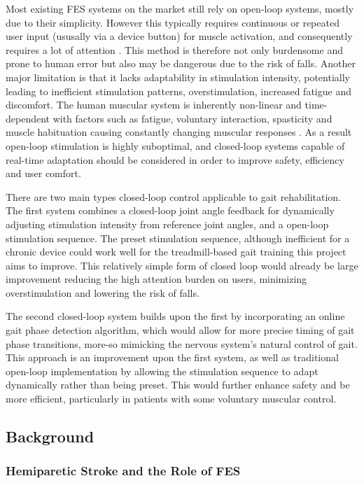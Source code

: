 Most existing FES systems on the market still rely on open-loop systems, mostly due to their simplicity\cite{braz_functional_2009}. However this typically requires continuous or repeated user input (ususally via a device button) for muscle activation, and consequently requires a lot of attention \cite{hayami_development_2022}. This method is therefore not only burdensome and prone to human error but also may be dangerous due to the risk of falls. Another major limitation is that it lacks adaptability in stimulation intensity, potentially leading to inefficient stimulation patterns, overstimulation, increased fatigue and discomfort. The human muscular system is inherently non-linear and time-dependent with factors such as fatigue, voluntary interaction, spasticity and muscle habituation causing constantly changing muscular responses  \cite{chaikho_transcutaneous_2022}. As a result open-loop stimulation is highly suboptimal, and closed-loop systems capable of real-time adaptation should be considered in order to improve safety, efficiency and user comfort.

There are two main types closed-loop control applicable to gait rehabilitation. The first system combines a closed-loop joint angle feedback for dynamically adjusting stimulation intensity from reference joint angles, and a open-loop stimulation sequence. The preset stimulation sequence, although inefficient for a chronic device could work well for the treadmill-based gait training this project aims to improve. This relatively simple form of closed loop would already be large improvement reducing the high attention burden on users, minimizing overstimulation and lowering the risk of falls.  

The second closed-loop system builds upon the first by incorporating an online gait phase detection algorithm, which would allow for more precise timing of gait phase transitions, more-so mimicking the nervous system's natural control of gait. This approach is an improvement upon the first system, as well as traditional open-loop implementation by allowing the stimulation sequence to adapt dynamically rather than being preset. This would further enhance safety and be more efficient, particularly in patients with some voluntary muscular control.


\subsection{Background}
\subsubsection*{Hemiparetic Stroke and the Role of FES}

